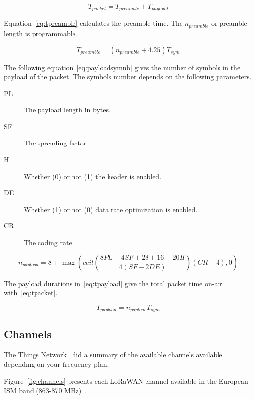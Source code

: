 \begin{equation}
  \label{eq:tpacket}
  T_{packet} = T_{preamble} + T_{payload}
\end{equation}

Equation~\ref{eq:tpreamble} calculates the preamble time. The $n_{preamble}$
or preamble length is programmable.

\begin{equation}
  \label{eq:tpreamble}
  T_{preamble} = (n_{preamble} + 4.25)T_{sym}
\end{equation}

The following equation~\ref{eq:payloadsymnb} gives the number of symbols in the
payload of the packet.
The symbols number depends on the following parameters.

\begin{description}
  \item[PL] The payload length in bytes.
  \item[SF] The spreading factor.
  \item[H] Whether (0) or not (1) the header is enabled.
  \item[DE] Whether (1) or not (0) data rate optimization is enabled.
  \item[CR] The coding rate.
\end{description}

\begin{equation}
  \label{eq:payloadsymnb}
  n_{payload} = 8 + \max(ceil(\frac{8PL - 4SF + 28 + 16 - 20H}{4(SF - 2DE)})(CR + 4),0)
\end{equation}

The payload durations in~\ref{eq:tpayload} give the total packet time on-air
with~\ref{eq:tpacket}.

\begin{equation}
  \label{eq:tpayload}
  T_{payload} = n_{payload} T_{sym}
\end{equation}


\subsection{Channels}

The Things Network~\cite{ttnfrequencyplans} did a summary of the available
channels available depending on your frequency plan.

Figure~\ref{fig:channels} presents each LoRaWAN channel available in the
European ISM band (863-870 MHz)~\cite{Polonelli_2019}.

